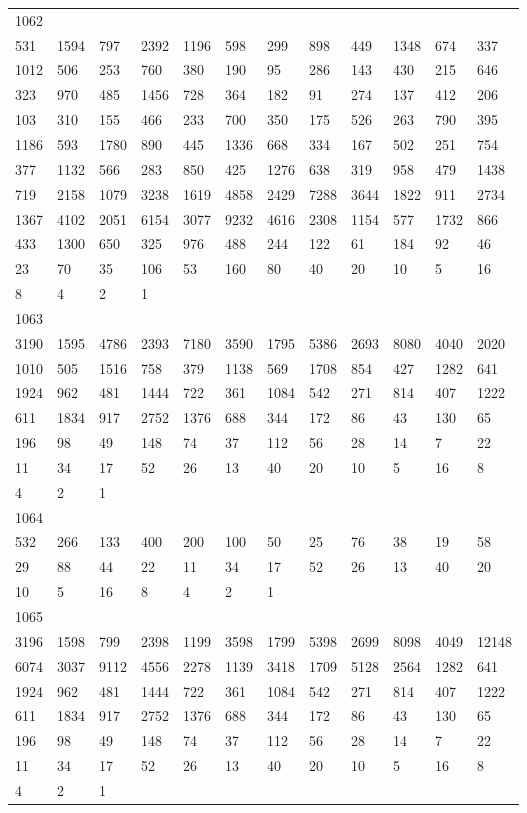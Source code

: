 \begin{longtable}{llllllllllll}
1062&&&&&&&&&&&\\
531& 1594& 797& 2392& 1196& 598& 299& 898& 449& 1348& 674& 337\\
1012& 506& 253& 760& 380& 190& 95& 286& 143& 430& 215& 646\\
323& 970& 485& 1456& 728& 364& 182& 91& 274& 137& 412& 206\\
103& 310& 155& 466& 233& 700& 350& 175& 526& 263& 790& 395\\
1186& 593& 1780& 890& 445& 1336& 668& 334& 167& 502& 251& 754\\
377& 1132& 566& 283& 850& 425& 1276& 638& 319& 958& 479& 1438\\
719& 2158& 1079& 3238& 1619& 4858& 2429& 7288& 3644& 1822& 911& 2734\\
1367& 4102& 2051& 6154& 3077& 9232& 4616& 2308& 1154& 577& 1732& 866\\
433& 1300& 650& 325& 976& 488& 244& 122& 61& 184& 92& 46\\
23& 70& 35& 106& 53& 160& 80& 40& 20& 10& 5& 16\\
8& 4& 2& 1& \\

1063&&&&&&&&&&&\\
3190& 1595& 4786& 2393& 7180& 3590& 1795& 5386& 2693& 8080& 4040& 2020\\
1010& 505& 1516& 758& 379& 1138& 569& 1708& 854& 427& 1282& 641\\
1924& 962& 481& 1444& 722& 361& 1084& 542& 271& 814& 407& 1222\\
611& 1834& 917& 2752& 1376& 688& 344& 172& 86& 43& 130& 65\\
196& 98& 49& 148& 74& 37& 112& 56& 28& 14& 7& 22\\
11& 34& 17& 52& 26& 13& 40& 20& 10& 5& 16& 8\\
4& 2& 1& \\

1064&&&&&&&&&&&\\
532& 266& 133& 400& 200& 100& 50& 25& 76& 38& 19& 58\\
29& 88& 44& 22& 11& 34& 17& 52& 26& 13& 40& 20\\
10& 5& 16& 8& 4& 2& 1& \\

1065&&&&&&&&&&&\\
3196& 1598& 799& 2398& 1199& 3598& 1799& 5398& 2699& 8098& 4049& 12148\\
6074& 3037& 9112& 4556& 2278& 1139& 3418& 1709& 5128& 2564& 1282& 641\\
1924& 962& 481& 1444& 722& 361& 1084& 542& 271& 814& 407& 1222\\
611& 1834& 917& 2752& 1376& 688& 344& 172& 86& 43& 130& 65\\
196& 98& 49& 148& 74& 37& 112& 56& 28& 14& 7& 22\\
11& 34& 17& 52& 26& 13& 40& 20& 10& 5& 16& 8\\
4& 2& 1& \\


\end{longtable}
